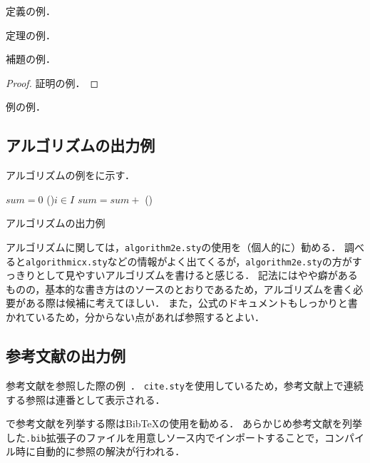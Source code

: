 \begin{definition}\label{def:example}
  定義の例．
  \END
\end{definition}

\begin{theorem}\label{thm:example}
  定理の例．
  \END
\end{theorem}

\begin{lemma}\label{lem:example}
  補題の例．
  \END
\end{lemma}

\begin{proof}
  証明の例．
\end{proof}

\begin{example}\label{eg:example}
  例の例．
  \END
\end{example}



\subsection{アルゴリズムの出力例}

アルゴリズムの例を\Fig{\ref{fig:algo:sample}}に示す．

\begin{algorithm}[t]
  \small
  \DontPrintSemicolon
  $sum = 0$\;
  \ForEach(){$i \in I$}{
    $sum = sum +$ 
  }
  \BlankLine
  \Proc(){}{
  }
  \caption{アルゴリズムの出力例}
  \label{fig:algo:sample}
\end{algorithm}

アルゴリズムに関しては，\texttt{algorithm2e.sty}の使用を（個人的に）勧める．
調べると\texttt{algorithmicx.sty}などの情報がよく出てくるが，\texttt{algorithm2e.sty}の方がすっきりとして見やすいアルゴリズムを書けると感じる．
記法にはやや癖があるものの，基本的な書き方は\Fig{\ref{fig:algo:sample}}のソースのとおりであるため，アルゴリズムを書く必要がある際は候補に考えてほしい．
また，公式のドキュメントもしっかりと書かれているため，分からない点があれば参照するとよい．



\subsection{参考文献の出力例}

参考文献を参照した際の例~\cite{book:Codd2002,book:Bayer2002:1,book:Bayer2002:2}．
\texttt{cite.sty}を使用しているため，参考文献上で連続する参照は連番として表示される．

{\LaTeXe}で参考文献を列挙する際はBibTeXの使用を勧める．
あらかじめ参考文献を列挙した\texttt{.bib}拡張子のファイルを用意し{\LaTeXe}ソース内でインポートすることで，コンパイル時に自動的に参照の解決が行われる．
